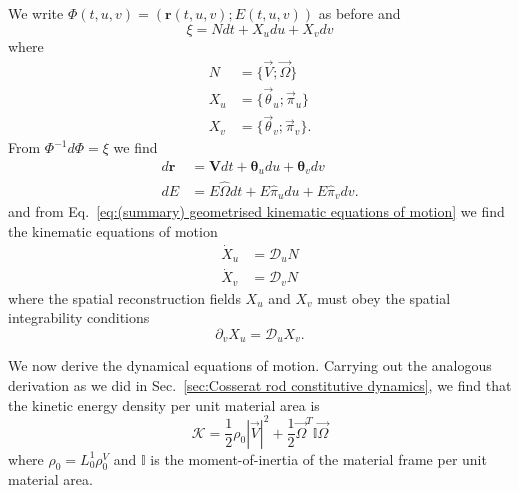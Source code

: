 We write $\Phi(t,u,v) = (\mathbf{r}(t, u,v) ; E(t,u,v))$ as before and
\begin{equation}
\xi = N dt + X_u du + X_v dv
\end{equation}
where
\begin{subequations} \label{eq:N X_alpha defs}
\begin{align}
N & = \{ \vec{V}; \vec{\Omega} \} \\
X_u & = \{ \vec{\theta}_u ; \vec{\pi}_u \} \\
X_v & = \{ \vec{\theta}_v ; \vec{\pi}_v \}.
\end{align}
\end{subequations}
From $\Phi^{-1} d \Phi = \xi$ we find
\begin{subequations} 
\begin{align}
d \mathbf{r} & = \mathbf{V} dt + \boldsymbol{\theta}_u du + \boldsymbol{\theta}_v dv  \\
d E & = E \hat{\Omega} dt + E \hat{\pi}_u du + E \hat{\pi}_v dv.
\end{align}
\end{subequations}
and from Eq.~\ref{eq:(summary) geometrised kinematic equations of motion} we find the kinematic equations of motion
\begin{subequations} \label{eq:cosserat surface eom}
\begin{align}
\dot{X}_u & = \mathcal{D}_u N \\
\dot{X}_v & = \mathcal{D}_v N
\end{align}
\end{subequations}
where the spatial reconstruction fields $X_u$ and $X_v$ must obey the spatial integrability conditions
\begin{equation} \label{eq:cosserat surface integrability}
\partial_v X_u = \mathcal{D}_u X_v.
\end{equation}

We now derive the dynamical equations of motion. Carrying out the analogous derivation as we did in Sec.~\ref{sec:Cosserat rod constitutive dynamics}, we find that the kinetic energy density per unit material area is
\begin{equation}
\mathcal{K} = \frac{1}{2} \rho_0 |\vec{V}|^2 + \frac{1}{2} \vec{\Omega}^T \mathbb{I} \vec{\Omega} 
\end{equation}
where $\rho_0 = L_0^1 \rho_0^V$ and $\mathbb{I}$ is the moment-of-inertia of the material frame per unit material area.

